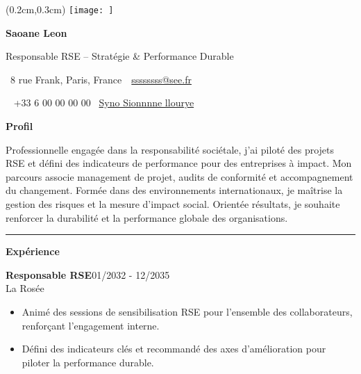 \documentclass[a4paper]{article}
\renewcommand{\colorbox}[2]{#2}%
\newcommand{\fullrule}{\hspace{-1.5cm}\rule{\paperwidth}{0.4pt}}
\newcommand{\cvsection}[1]{%
  \vspace{6pt}\textbf{\Large #1}\par\vspace{2pt}}
\begin{document}
\ifx\relax\relax\else
\begin{textblock*}{4cm}(0.2cm,0.3cm)
  \texttt{[image: ]}
\end{textblock*}
 \fi
\begin{center}
  {\fontsize{44pt}{24pt}\selectfont\bfseries Saoane Leon}

  \bigskip
  {\Large Responsable RSE – Stratégie \& Performance Durable}

  \bigskip\bigskip
  \faMapMarker~8 rue Frank, Paris, France\ 
  \quad\faEnvelope~\href{mailto:ssssssss@see.fr}{ssssssss@see.fr}

  \bigskip
  \faPhone~ +33 6 00 00 00 00
  \quad \faLinkedin\ \href{Syno Sionnnne llourye}{Syno Sionnnne llourye}
 

  
\end{center}
 \vspace{0.6cm}
\cvsection{Profil}
\vspace{0.3cm}
Professionnelle engagée dans la responsabilité sociétale, j’ai piloté des projets RSE et défini des indicateurs de performance pour des entreprises à impact. Mon parcours associe management de projet, audits de conformité et accompagnement du changement. Formée dans des environnements internationaux, je maîtrise la gestion des risques et la mesure d’impact social. Orientée résultats, je souhaite renforcer la durabilité et la performance globale des organisations.

\medskip\fullrule

\cvsection{Expérience}
\vspace{0.3cm}
\colorbox{maincolor}{%
  \begin{minipage}{\linewidth}
    \noindent
    \textbf{Responsable RSE}\hfill 01/2032 - 12/2035\\
    La Rosée\\[-0.3em]
    \begin{itemize}[leftmargin=*]
      \item Animé des sessions de sensibilisation RSE pour l’ensemble des collaborateurs, renforçant l’engagement interne. \item Défini des indicateurs clés et recommandé des axes d’amélioration pour piloter la performance durable.
    \end{itemize}
  \end{minipage}}
\end{document}
